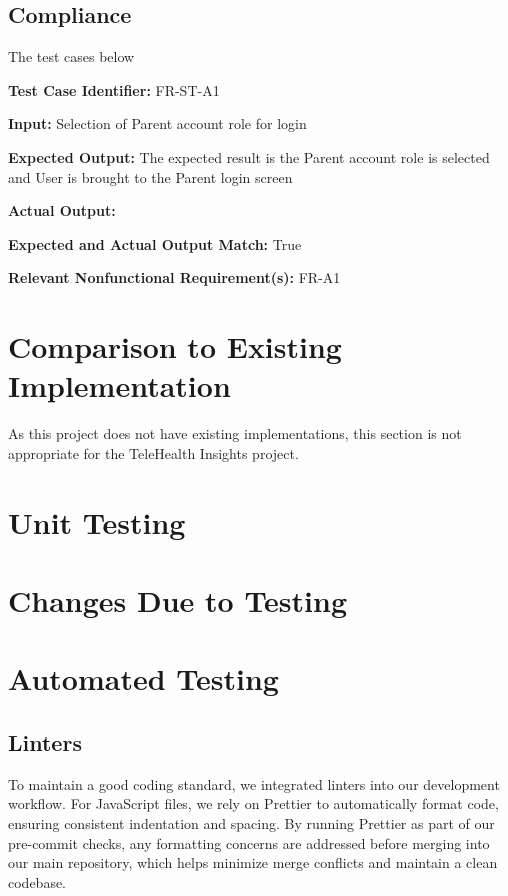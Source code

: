 \documentclass[12pt, titlepage]{article}
\begin{document}
\subsection{Compliance}
\hspace{2em}The test cases below 

\begin{mdframed}[linewidth=0.5mm] \par
  \textbf{Test Case Identifier:} FR-ST-A1 \par
  \textbf{Input:} Selection of Parent account role for login \par
  \textbf{Expected Output:} The expected result is the Parent account role is selected and User is brought to the Parent login screen \par
  \textbf{Actual Output:} \par
  \textbf{Expected and Actual Output Match:} True \par
  \textbf{Relevant Nonfunctional Requirement(s):} FR-A1
\end{mdframed}
	
\section{Comparison to Existing Implementation}	

As this project does not have existing implementations, this section is not appropriate for the TeleHealth Insights project.

\section{Unit Testing}

\section{Changes Due to Testing}


\section{Automated Testing}

\subsection{Linters}
To maintain a good coding standard, we integrated linters into
our development workflow. For JavaScript files, we rely on Prettier to
automatically format code, ensuring consistent indentation and spacing.
By running Prettier as part of our pre-commit checks, any formatting concerns
are addressed before merging into our main repository, which helps minimize merge
conflicts and maintain a clean codebase.
\end{document}
